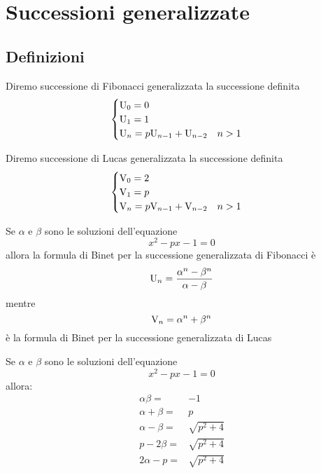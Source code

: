 \chapter{Successioni generalizzate}
\section{Definizioni}
\begin{defn}
	Diremo successione di Fibonacci generalizzata la successione definita
	\begin{equation}
		\begin{cases}
			\mathrm{U}_{0}=0\\
			\mathrm{U}_{1}=1\\
			\mathrm{U}_{n}=p\mathrm{U}_{n-1}+\mathrm{U}_{n-2}\quad n>1\\
		\end{cases}
	\end{equation} 
\end{defn}\cite{Yalciner2013}
\begin{defn}
Diremo successione di Lucas generalizzata la successione definita
\begin{equation}
	\begin{cases}
		\mathrm{V}_{0}=2\\
		\mathrm{V}_{1}=p\\
		\mathrm{V}_{n}=p\mathrm{V}_{n-1}+\mathrm{V}_{n-2}\quad n>1\\
	\end{cases}
\end{equation}
\end{defn}\cite{Yalciner2013} 
\begin{thm}
	Se $\alpha$ e $\beta$ sono le soluzioni dell'equazione \begin{equation}
		x^2-px-1=0
	\end{equation} allora la formula di Binet per la successione
 generalizzata 
	di Fibonacci è \begin{equation}
	\mathrm{U}_{n}=\dfrac{\alpha^n-\beta^n}{\alpha-\beta}
\end{equation}
mentre \begin{equation}
	\mathrm{V}_{n}=\alpha^n+\beta^n
\end{equation}
è la formula di Binet per la successione generalizzata di Lucas 
\end{thm}\cite{Yalciner2013} 
\begin{lem}[Proprietà]
	Se $\alpha$ e $\beta$ sono le soluzioni dell'equazione \begin{equation}
	x^2-px-1=0
\end{equation} allora:
\begin{align*}
	\alpha\beta=&-1\\
	\alpha+\beta=&p\\
	\alpha-\beta=&\sqrt{p^2+4}\\
	p-2\beta=&\sqrt{p^2+4}\\
	2\alpha-p =&\sqrt{p^2+4}\\
\end{align*}
\end{lem}